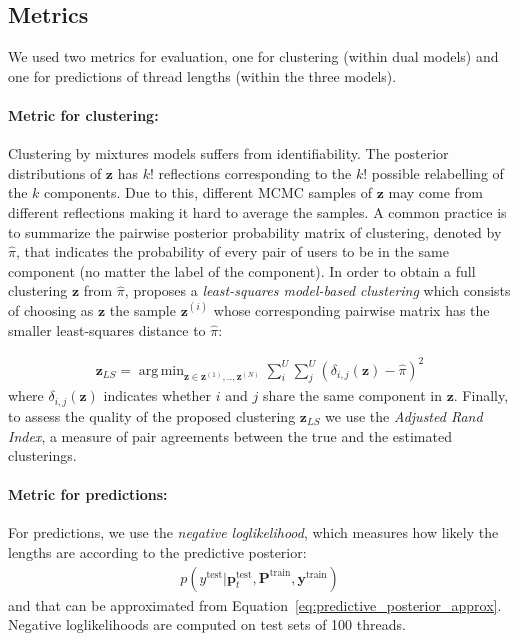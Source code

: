 \documentclass[smallextended]{svjour3}          %
\DeclareMathOperator*{\argmin}{arg\,min}
\begin{document}
\subsection{Metrics}
We used two metrics for evaluation, one for clustering (within dual models) and one for predictions of thread lengths (within the three models). 

\paragraph{Metric for clustering:}
Clustering by mixtures models suffers from identifiability. The posterior distributions of $\mathbf{z}$ has $k!$ reflections corresponding to the $k!$ possible relabelling of the $k$ components. Due to this, different MCMC samples of $\mathbf{z}$ may come from different reflections making it hard to average the samples. A common practice is to summarize the pairwise posterior probability matrix of clustering, denoted by $\hat{\pi}$, that indicates the probability of every pair of users to be in the same component (no matter the label of the component). In order to obtain a full clustering $\mathbf{z}$ from $\hat{\pi}$, \cite{Dahl2006} proposes a \textit{least-squares model-based clustering} which consists of choosing as $\mathbf{z}$ the sample $\mathbf{z}^{(i)}$ whose corresponding pairwise matrix has the smaller least-squares distance to $\hat{\pi}$:

\begin{align}
\mathbf{z}_{LS} = \argmin_{\mathbf{z} \in \mathbf{z}^{(1)},..,\mathbf{z}^{(N)}} \sum_i^U \sum_j^U (\delta_{i,j}(\mathbf{z}) - \hat{\pi})^2
\end{align}
where $\delta_{i,j}(\mathbf{z})$ indicates whether $i$ and $j$ share the same component in $\mathbf{z}$.
Finally, to assess the quality of the proposed clustering $\mathbf{z}_{LS}$ we use the \textit{Adjusted Rand Index}, a measure of pair agreements between the true and the estimated clusterings.

\paragraph{Metric for predictions:}
For predictions, we use the \textit{negative loglikelihood}, 
which measures how likely the lengths are according to the predictive posterior:
\begin{align}
p(y^{\text{test}} | \mathbf{p}_t^{\text{test}}, \mathbf{P}^{\text{train}}, \mathbf{y}^{\text{train}})
\end{align}
and that can be approximated from Equation~\ref{eq:predictive_posterior_approx}. Negative loglikelihoods are computed on test sets of 100 threads.
\end{document}
